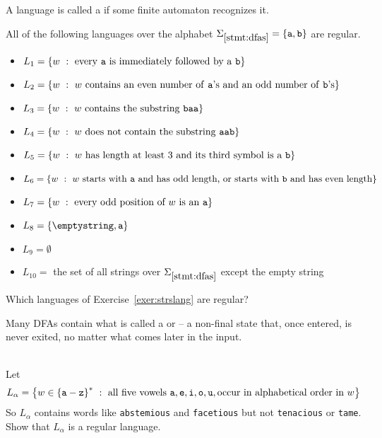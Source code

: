 \documentclass[twoside,letterpaper,openany]{book}
\begin{document}
\begin{defn}
A language is called a  if some finite automaton recognizes it.
\end{defn}

\begin{stmt2}\label{stmt:dfas}
All of the following languages over the alphabet $\Sigma_{\ref{stmt:dfas}} = \left\lbrace \texttt{a}, \texttt{b} \right\rbrace$ are regular.
\begin{itemize}
\item $L_1 = \left\lbrace w\ :\ \textrm{every \texttt{a} is immediately followed by a \texttt{b}} \right\rbrace$
\item $L_2 = \left\lbrace w\ :\ w~\textrm{contains an even number of \texttt{a}'s and an odd number of \texttt{b}'s} \right\rbrace$
\item $L_3 = \left\lbrace w\ :\ w~\textrm{contains the substring \texttt{baa}} \right\rbrace$
\item $L_4 = \left\lbrace w\ :\ w~\textrm{does not contain the substring \texttt{aab}} \right\rbrace$
\item $L_5 = \left\lbrace w\ :\ w~\textrm{has length at least 3 and its third symbol is a}~\texttt{b} \right\rbrace$
\item $L_6 = \left\lbrace w\ :\ w~\textrm{starts with \texttt{a} and has odd length, or starts with \texttt{b} and has even length} \right\rbrace$
\item $L_7 = \left\lbrace w\ :\ \textrm{every odd position of}~w~\textrm{is an}~\texttt{a} \right\rbrace$
\item $L_8 = \setdef{\emptystring, \texttt{a}}$
\item $L_9 = \emptyset$
\item $L_{10} = $ the set of all strings over $\Sigma_{\ref{stmt:dfas}}$ except the empty string
\end{itemize}
\end{stmt2}

\begin{exer2}\label{stmt:dfas2}
Which languages of Exercise~\ref{exer:strslang} are regular?
\end{exer2}

\begin{discussion}
Many DFAs contain what is called a  or  -- a non-final state that, once entered, is never exited, no matter what comes later in the input. 
\end{discussion}

\begin{exer2}~\\
Let \[L_\alpha = \setbuild{w \in \setstar{\setdef{\texttt{a} - \texttt{z}}}}{\textrm{all five vowels}\ \texttt{a}, \texttt{e},
			\texttt{i}, \texttt{o}, \texttt{u}, \textrm{occur in alphabetical order in}~w}\]
So $L_\alpha$ contains words like \texttt{abstemious} and \texttt{facetious} but not \texttt{tenacious} or \texttt{tame}. Show that $L_\alpha$ is a regular language.
\end{exer2}
\end{document}
